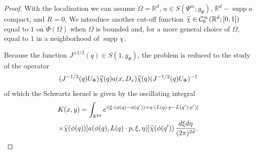 \documentclass[AHL,Unicode,longabstracts]{cedram}
\newcommand{\R}{\mathbb{R}}
\newcommand{\clC}{\mathcal{C}}
\DeclareMathOperator{\suppp}{supp}
\let\oldtilde\tilde
\renewcommand*{\tilde}[1]{\mathchoice{\widetilde{#1}}{\widetilde{#1}}{\oldtilde{#1}}{\oldtilde{#1}}}
\begin{document}
\begin{proof}
With the localization we can assume $\Omega=\R^{d}$, $a\in S(\Psi^{m};g_{\Psi})$, $\R^{d}-\suppp a$ compact, and $R=0$. We introduce another cut-off function $\tilde{\chi}\in \clC^{\infty}_{0}(\R^{d};[0,1])$ equal to $1$ on $\Phi(\Omega)$ when $\Omega$ is bounded and, for a more general choice of $\Omega$, equal to $1$ in a neighborhood of $\suppp\chi$.

Because the function $J^{\pm 1/2}(q)\in S(1,g_{\Psi})$, the problem is reduced to the study of the operator
\[
(J^{-1/2}(q)U_{\Phi})\tilde{\chi}(q)a(x,D_{x})\tilde{\chi}(q)(J^{-1/2}(q)U_{\Phi})^{-1}
\]
of which the Schwartz kernel is given by the oscillating integral
\begin{multline*}
K(x,y)=\int_{\R^{2d}}e^{i[\xi\cdot (\phi(q)-\phi(q'))+\eta\cdot(L(q)\cdot p-L(q')\cdot p')]}\\
\times
\tilde{\chi}(\phi(q))[a(\phi(q),L(q)\cdot p,\xi,\eta)]\tilde{\chi}(\phi(q'))\,\frac{d\xi d\eta}{(2\pi)^{2d}}.
\end{multline*}


\end{proof}
\end{document}
